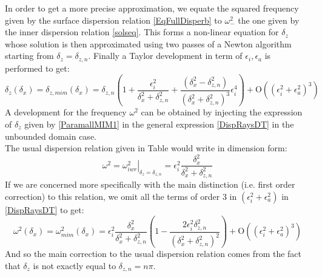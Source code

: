 In order to get a more precise approximation, we equate the squared frequency given by the surface dispersion relation \ref{EqFullDisperb} to $\omega_-^2$ the one given by the inner dispersion relation \ref{solseq}. This forms a non-linear equation for $\delta_z$ whose solution is then approximated using two passes of a Newton algorithm starting from $\delta_z=\delta_{z,n}$. Finally a Taylor development in term of $\epsilon_i, \epsilon_a$ is performed to get:
\begin{equation}
\delta_{z}(\delta_x)=\delta_{z,mim}(\delta_x)=
	\delta_{z,n}
	\left(
	1+\frac{\epsilon_i^2}{\delta_x^2+\delta_{z,n}^2}
	+\frac{(\delta_x^2-\delta_{z,n}^2)}{(\delta_x^2+\delta_{z,n}^2)^3}\epsilon_i^4
	\right)
	+\mathrm{O}	((\epsilon_i^2+\epsilon_a^2)^3)
	\label{ParamallMIM1}
\end{equation}
A development for the frequency $\omega^2$ can be obtained by injecting the expression of $\delta_z$ given by \ref{ParamallMIM1} in the general expression \ref{DispRaysDT} in the unbounded domain case.\\
The usual dispersion relation given in Table  would write in dimension form:
\[
\omega^2=\left.\omega_{iwr}^2\right|_{\delta_z=\delta_{z,n}}=\epsilon_i^2\frac{\delta_x^2}{\delta_x^2+\delta_{z,n}^2}
\]
If we are concerned more specifically with the main distinction (i.e. first order correction) to this relation, we omit all the terms of order 3 in $(\epsilon_i^2+\epsilon_a^2)$ in \ref{DispRaysDT} to get:
 \begin{equation}
\omega^2(\delta_x)=\omega_{mim}^2(\delta_x)=
\epsilon_i^2\frac{\delta_x^2}{\delta_x^2+\delta_{z,n}^2}
\left(1-\frac{2\epsilon_i^2\delta_{z,n}^2}{(\delta_x^2+\delta_{z,n}^2)^2}\right) +\mathrm{O}	((\epsilon_i^2+\epsilon_a^2)^3)
\label{ParamallMIM2}
\end{equation}
And so the main correction to the usual dispersion relation comes from the fact that $\delta_z$ is not exactly equal to $\delta_{z,n}=n\pi$.
